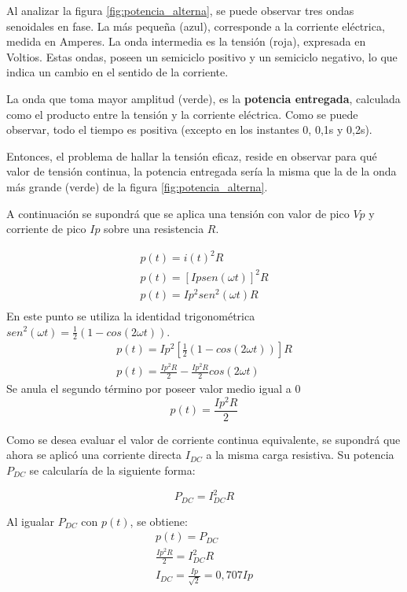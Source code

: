 Al analizar la figura \ref{fig:potencia_alterna}, se puede observar tres ondas senoidales en fase. La más pequeña (azul), corresponde a la corriente eléctrica, medida en Amperes. La onda intermedia es la tensión (roja), expresada en Voltios. Estas ondas, poseen un semiciclo positivo y un semiciclo negativo, lo que indica un cambio en el sentido de la corriente.

La onda que toma mayor amplitud (verde), es la \textbf{potencia entregada}, calculada como el producto entre la tensión y la corriente eléctrica. Como se puede observar, todo el tiempo es positiva (excepto en los instantes 0, 0,1s y 0,2s).

Entonces, el problema de hallar la tensión eficaz, reside en observar para qué valor de tensión continua, la potencia entregada sería la misma que la de la onda más grande (verde) de la figura \ref{fig:potencia_alterna}.

A continuación se supondrá que se aplica una tensión con valor de pico $Vp$ y corriente de pico $Ip$ sobre una resistencia $R$.

\begin{eqnarray*}
	p(t)= i(t)^{2} R \\
	p(t)= [Ip sen(\omega t)]^{2} R \\
	p(t)= Ip^{2}sen^{2}(\omega t)R \\
\end{eqnarray*}
En este punto se utiliza la identidad trigonométrica $sen^{2}(\omega t) = \frac{1}{2}(1-cos(2\omega t))$.
\begin{eqnarray*}
	p(t)= Ip^{2}[\frac{1}{2}(1-cos(2 \omega t))]R \\
	p(t)=\frac{Ip^{2}R}{2}-\frac{Ip^{2}R}{2}cos(2 \omega t)
\end{eqnarray*}
Se anula el segundo término  por poseer valor medio igual a 0
 $$	p(t)=\frac{Ip^{2}R}{2} $$

Como se desea evaluar el valor de corriente continua equivalente, se supondrá que ahora se aplicó una corriente directa $I_{DC}$ a la misma carga resistiva. Su potencia $P_{DC}$ se calcularía de la siguiente forma:

$$ P_{DC} = I_{DC}^{2}R $$

Al igualar $P_{DC}$ con $p(t)$, se obtiene:
\begin{eqnarray*}
	p(t)=P_{DC} \\
	\frac{Ip^{2}R}{2}=I_{DC}^{2}R \\
	I_{DC}=\frac{Ip}{\sqrt{2}}=0,707Ip
\end{eqnarray*}

